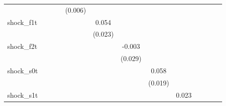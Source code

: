{\begin{tabular}{l*{12}{c}}
            &                     &                     &                     &     (0.006)         &                     &                     &                     &                     &                     &                     &                     &                     \\
\addlinespace
shock\_f1t   &                     &                     &                     &                     &       0.054\sym{**} &                     &                     &                     &                     &                     &                     &                     \\
            &                     &                     &                     &                     &     (0.023)         &                     &                     &                     &                     &                     &                     &                     \\
\addlinespace
shock\_f2t   &                     &                     &                     &                     &                     &      -0.003         &                     &                     &                     &                     &                     &                     \\
            &                     &                     &                     &                     &                     &     (0.029)         &                     &                     &                     &                     &                     &                     \\
\addlinespace
shock\_s0t   &                     &                     &                     &                     &                     &                     &       0.058\sym{***}&                     &                     &                     &                     &                     \\
            &                     &                     &                     &                     &                     &                     &     (0.019)         &                     &                     &                     &                     &                     \\
\addlinespace
shock\_s1t   &                     &                     &                     &                     &                     &                     &                     &       0.023         &                     &                     &                     &                     \\

\end{tabular}}
